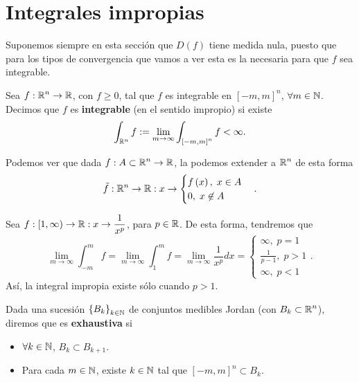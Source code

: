 \section{Integrales impropias}
\begin{observation}
Suponemos siempre en esta sección que $\displaystyle D\left(f\right) $ tiene medida nula, puesto que para los tipos de convergencia que vamos a ver esta es la necesaria para que $\displaystyle f $ sea integrable.
\end{observation}
\begin{definition}
	Sea $\displaystyle f : \mathbb{R}^{n} \to \mathbb{R} $, con $\displaystyle f \geq 0 $, tal que $\displaystyle f $ es integrable en $\displaystyle \left[-m,m\right] ^{n} $, $\displaystyle \forall m \in \mathbb{N} $. Decimos que $\displaystyle f $ es \textbf{integrable} (en el sentido impropio) si existe
	\[ \int _{\mathbb{R}^{n}}f :=\lim_{m \to \infty}\int _{\left[-m,m\right] ^{n}}f <\infty.\]
\end{definition}
\begin{observation}
Podemos ver que dada $\displaystyle f : A \subset \mathbb{R}^{n} \to \mathbb{R} $, la podemos extender a $\displaystyle \mathbb{R}^{n} $ de esta forma
\[\tilde{f} : \mathbb{R}^{n} \to \mathbb{R} : x \to 
\begin{cases}
f\left(x\right), \; x \in A\\
0, \; x \not\in A
\end{cases}
.\]
\end{observation}

\begin{eg}
Sea $\displaystyle f : [1,\infty) \to \mathbb{R} : x \to \frac{1}{x^{p}} $, para $\displaystyle p \in \mathbb{R} $. De esta forma, tendremos que 
\[\lim_{m \to \infty}\int^{m}_{-m} f =\lim_{m \to \infty}\int^{m}_{1} f =\lim_{m \to \infty}\frac{1}{x^{p}}dx =
\begin{cases}
\infty, \; p = 1 \\
\frac{1}{p-1}, \; p > 1\\
\infty, \; p < 1
\end{cases}
.\]
Así, la integral impropia existe sólo cuando $\displaystyle p > 1 $. 
\end{eg}
\begin{definition}
	Dada una sucesión $\displaystyle \left\{ B_{k}\right\} _{k \in \mathbb{N}} $ de conjuntos medibles Jordan (con $\displaystyle B_{k}\subset \mathbb{R}^{n} $), diremos que es \textbf{exhaustiva} si 
	\begin{itemize}
	\item $\displaystyle \forall k \in \mathbb{N} $, $\displaystyle B_{k}\subset B_{k+1} $.
	\item Para cada $\displaystyle m \in \mathbb{N} $, existe $\displaystyle k \in \mathbb{N} $ tal que $\displaystyle \left[-m,m\right] ^{n}\subset B_{k} $.
	\end{itemize}
\end{definition}

